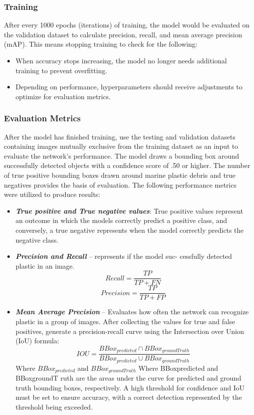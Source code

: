 \documentclass[a4paper,fleqn]{cas-dc}
\begin{document}
\begin{enumerate}[label={\alph*})]
\subsubsection{Training}
After every 1000 epochs (iterations) of training, the model would be evaluated on the validation dataset to calculate precision, recall, and mean average precision (mAP). This means stopping training to check for the following:

\begin{itemize}
\item When accuracy stops increasing, the model no longer needs additional training to prevent overfitting.
\item Depending on performance, hyperparameters should receive adjustments to optimize for evaluation metrics.
\end{itemize}

\subsubsection{Evaluation Metrics}
After the model has finished training, use the testing and validation datasets containing images mutually exclusive from the training dataset as an input to evaluate the network’s performance.
The model draws a bounding box around successfully detected objects with a confidence score of .50 or higher. The number of true positive bounding boxes drawn around marine plastic debris and true negatives provides the basis of evaluation. The following performance metrics were utilized to produce results:


\begin{itemize}
\item \textit {\textbf{True positive and True negative values}}: True positive values represent an outcome in which the models correctly predict a positive class, and conversely, a true negative represents when the model correctly predicts the negative class.

\item \textit{\textbf{Precision and Recall}} -- represents if the model suc- cessfully detected plastic in an image.
\[Recall = \frac{TP}{TP+FN}\]
\[Precision = \frac{TP}{TP+FP}\]
\item \textit{\textbf{Mean Average Precision}} -- Evaluates how often the network can recognize plastic in a group of images. After collecting the values for true and false positives, generate a precision-recall curve using the Intersection over Union (IoU) formula:
\[ \textit{IOU}=\frac{BBox_{predicted} \cap BBox_{groundTruth}}{BBox_{predicted} \cup BBox_{groundTruth}} \]
Where \(BBox_{predicted} \)
and \(BBox_{groundTruth}\)
Where BBoxpredicted and BBoxgroundT ruth are the areas under the curve for predicted and ground truth bounding boxes, respectively. A high threshold for confidence and IoU must be set to ensure accuracy, with a correct detection represented by the threshold being exceeded.


\end{itemize}
\end{enumerate}
\end{document}
